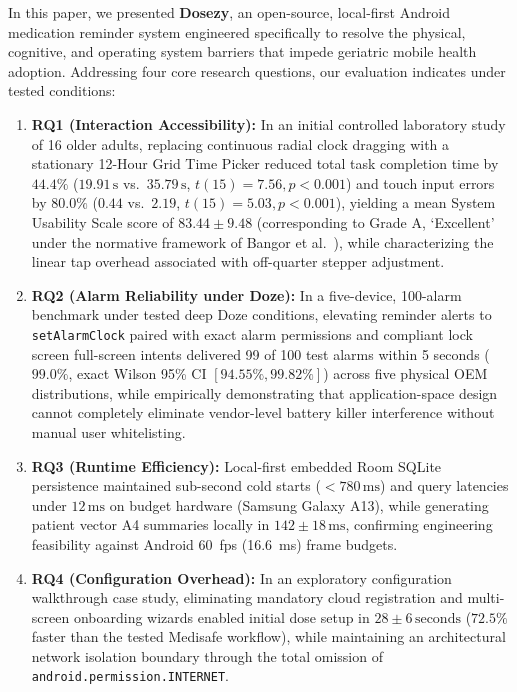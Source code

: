 \documentclass[11pt,a4paper]{article}
\begin{document}
In this paper, we presented \textbf{Dosezy}, an open-source, local-first Android medication reminder system engineered specifically to resolve the physical, cognitive, and operating system barriers that impede geriatric mobile health adoption. Addressing four core research questions, our evaluation indicates under tested conditions:
\begin{enumerate}
    \item \textbf{RQ1 (Interaction Accessibility):} In an initial controlled laboratory study of 16 older adults, replacing continuous radial clock dragging with a stationary 12-Hour Grid Time Picker reduced total task completion time by $44.4\%$ ($19.91\,\text{s}$ vs.\ $35.79\,\text{s}$, $t(15) = 7.56, p < 0.001$) and touch input errors by $80.0\%$ ($0.44$ vs.\ $2.19$, $t(15) = 5.03, p < 0.001$), yielding a mean System Usability Scale score of $83.44 \pm 9.48$ (corresponding to Grade A, `Excellent' under the normative framework of Bangor et al.~\cite{bangor2008empirical,lewis2009factor}), while characterizing the linear tap overhead associated with off-quarter stepper adjustment.
    \item \textbf{RQ2 (Alarm Reliability under Doze):} In a five-device, 100-alarm benchmark under tested deep Doze conditions, elevating reminder alerts to \texttt{setAlarmClock} paired with exact alarm permissions and compliant lock screen full-screen intents delivered 99 of 100 test alarms within 5 seconds ($99.0\%$, exact Wilson 95\% CI $[94.55\%, 99.82\%]$) across five physical OEM distributions, while empirically demonstrating that application-space design cannot completely eliminate vendor-level battery killer interference without manual user whitelisting.
    \item \textbf{RQ3 (Runtime Efficiency):} Local-first embedded Room SQLite persistence maintained sub-second cold starts ($< 780\,\text{ms}$) and query latencies under $12\,\text{ms}$ on budget hardware (Samsung Galaxy A13), while generating patient vector A4 summaries locally in $142 \pm 18\,\text{ms}$, confirming engineering feasibility against Android 60~fps (16.6~ms) frame budgets.
    \item \textbf{RQ4 (Configuration Overhead):} In an exploratory configuration walkthrough case study, eliminating mandatory cloud registration and multi-screen onboarding wizards enabled initial dose setup in $28 \pm 6\,\text{seconds}$ ($72.5\%$ faster than the tested Medisafe workflow), while maintaining an architectural network isolation boundary through the total omission of \texttt{android.permission.INTERNET}.
\end{enumerate}
\end{document}
